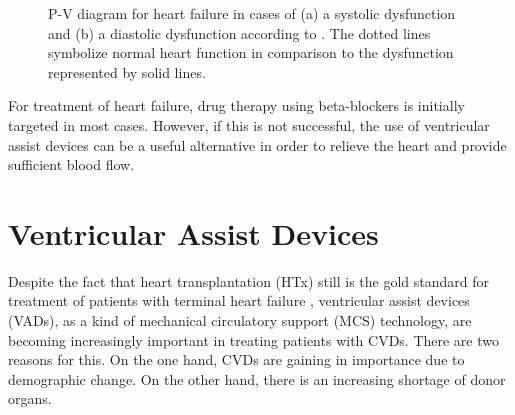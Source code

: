 \begin{figure}[h]
  \centering
  \caption[P-V diagram for heart failure]{P-V diagram for heart failure in cases of (a) a systolic dysfunction and (b) a diastolic dysfunction according to \cite{HKS_pv}. The dotted lines symbolize normal heart function in comparison to the dysfunction represented by solid lines.}
  \label{fig:hf_dys}
\end{figure}

For treatment of heart failure, drug therapy using beta-blockers is initially targeted in most cases. However, if this is not successful, the use of ventricular assist devices can be a useful alternative in order to relieve the heart and provide sufficient blood flow. \cite{HKS4}

\section{Ventricular Assist Devices}
Despite the fact that heart transplantation (HTx) still is the gold standard for treatment of patients with terminal heart failure \cite{VAD2}, ventricular assist devices (VADs), as a kind of mechanical circulatory support (MCS) technology, are becoming increasingly important in treating patients with CVDs. There are two reasons for this. On the one hand, CVDs are gaining in importance due to demographic change. On the other hand, there is an increasing shortage of donor organs. \cite{VAD7}

